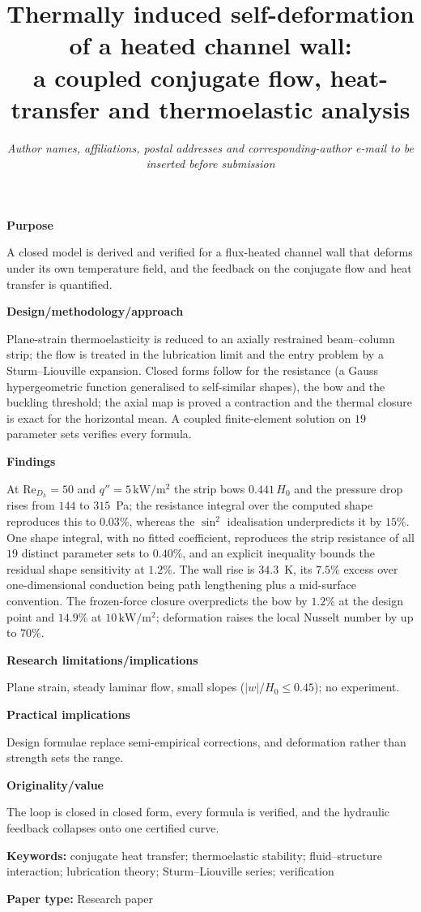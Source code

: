 \documentclass[11pt,a4paper]{article}
\title{\bfseries Thermally induced self-deformation of a heated channel wall:\\
a coupled conjugate flow, heat-transfer and thermoelastic analysis}
\author{%
  \normalsize\textit{Author names, affiliations, postal addresses and
  corresponding-author e-mail to be inserted before submission}%
}
\date{}
\newcommand{\ReDh}{\mathrm{Re}_{D_h}}
\newcommand{\abshead}[1]{\par\vspace{5pt}\noindent\textbf{#1}\par\nobreak\vspace{1pt}}
\newenvironment{structuredabstract}%
  {\par\small\setlength{\parindent}{0pt}\setlength{\parskip}{2pt}}%
  {\par\medskip}
\begin{document}
\maketitle
\thispagestyle{empty}

\begin{structuredabstract}
\abshead{Purpose}
A closed model is derived and verified for a flux-heated channel wall that deforms under its
own temperature field, and the feedback on the conjugate flow and heat transfer is quantified.

\abshead{Design/methodology/approach}
Plane-strain thermoelasticity is reduced to an axially restrained beam--column strip; the flow
is treated in the lubrication limit and the entry problem by a Sturm--Liouville expansion.
Closed forms follow for the resistance (a Gauss hypergeometric function generalised to
self-similar shapes), the bow and the buckling threshold; the axial map is proved a contraction
and the thermal closure is exact for the horizontal mean. A coupled finite-element solution on
$19$ parameter sets verifies every formula.

\abshead{Findings}
At $\ReDh=50$ and $q''=5\,\mathrm{kW/m^2}$ the strip bows $0.441\,H_0$ and the pressure drop
rises from $144$ to $315$~Pa; the resistance integral over the computed shape reproduces this
to $0.03\%$, whereas the $\sin^2$ idealisation underpredicts it by $15\%$. One shape integral,
with no fitted coefficient, reproduces the strip resistance of all $19$ distinct parameter sets
to $0.40\%$, and an explicit inequality bounds the residual shape sensitivity at $1.2\%$. The
wall rise is $34.3$~K, its $7.5\%$ excess over one-dimensional conduction being path
lengthening plus a mid-surface convention. The frozen-force closure overpredicts the bow by
$1.2\%$ at the design point and $14.9\%$ at $10\,\mathrm{kW/m^2}$; deformation raises the local
Nusselt number by up to $70\%$.

\abshead{Research limitations/implications}
Plane strain, steady laminar flow, small slopes ($|w|/H_0\le0.45$); no experiment.

\abshead{Practical implications}
Design formulae replace semi-empirical corrections, and deformation rather than strength sets
the range.

\abshead{Originality/value}
The loop is closed in closed form, every formula is verified, and the hydraulic feedback
collapses onto one certified curve.

\vspace{3pt}
\noindent\textbf{Keywords:} conjugate heat transfer; thermoelastic stability;
fluid--structure interaction; lubrication theory; Sturm--Liouville series;
verification

\vspace{2pt}
\noindent\textbf{Paper type:} Research paper
\end{structuredabstract}
\end{document}

